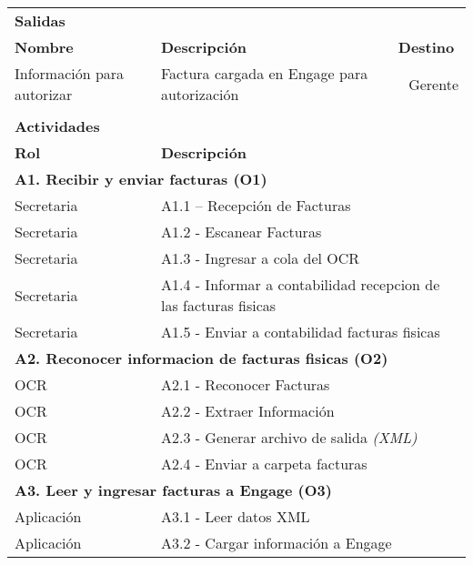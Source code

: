\begin{longtable}{|llrrrrrr|}
       &       &       &       &       &       &       &  \\ \hline
    \multicolumn{8}{|l|}{\textbf{Salidas}} \\ \hline
    \textbf{Nombre} & \multicolumn{5}{|l|}{\textbf{Descripción}} & \multicolumn{2}{|l|}{\textbf{Destino}} \\ \hline
     Información para autorizar & \multicolumn{5}{|m{6cm}|}{Factura cargada en Engage para autorización} & \multicolumn{2}{|m{3cm}|}{Gerente} \\ \hline
       &       &       &       &       &       &       &  \\ \hline
	
	\multicolumn{8}{|l|}{\textbf{Actividades}} \\ \hline
    \textbf{Rol} & \multicolumn{7}{|l|}{\textbf{Descripción}} \\ \hline 
    \multicolumn{8}{|l|}{\textbf{A1. Recibir y enviar facturas  (O1) }} \\ \hline
    Secretaria & \multicolumn{7}{|m{12cm}|}{A1.1 – Recepción de Facturas} \\ \hline
    Secretaria & \multicolumn{7}{|m{12cm}|}{A1.2 - Escanear Facturas} \\ \hline
    Secretaria & \multicolumn{7}{|m{12cm}|}{A1.3 - Ingresar a cola del OCR} \\ \hline
    Secretaria & \multicolumn{7}{|m{12cm}|}{A1.4 - Informar a contabilidad recepcion de las facturas fisicas} \\ \hline
    Secretaria & \multicolumn{7}{|m{12cm}|}{A1.5 -  Enviar a contabilidad facturas fisicas} \\ \hline 
   
    \multicolumn{8}{|l|}{\textbf{A2. Reconocer informacion de facturas fisicas  (O2) }} \\ \hline
    OCR & \multicolumn{7}{|m{12cm}|}{A2.1 - Reconocer Facturas} \\ \hline
    OCR & \multicolumn{7}{|m{12cm}|}{A2.2 - Extraer Información} \\ \hline
    OCR & \multicolumn{7}{|m{12cm}|}{A2.3 - Generar archivo de salida \textit{(XML)}} \\ \hline
    OCR & \multicolumn{7}{|m{12cm}|}{A2.4 - Enviar a carpeta facturas} \\ \hline
    
    \multicolumn{8}{|l|}{\textbf{A3. Leer y ingresar facturas a Engage (O3) }} \\ \hline
    Aplicación & \multicolumn{7}{|m{12cm}|}{A3.1 - Leer datos XML} \\ \hline
    Aplicación & \multicolumn{7}{|m{12cm}|}{A3.2 - Cargar información a Engage} \\ \hline


\end{longtable}
